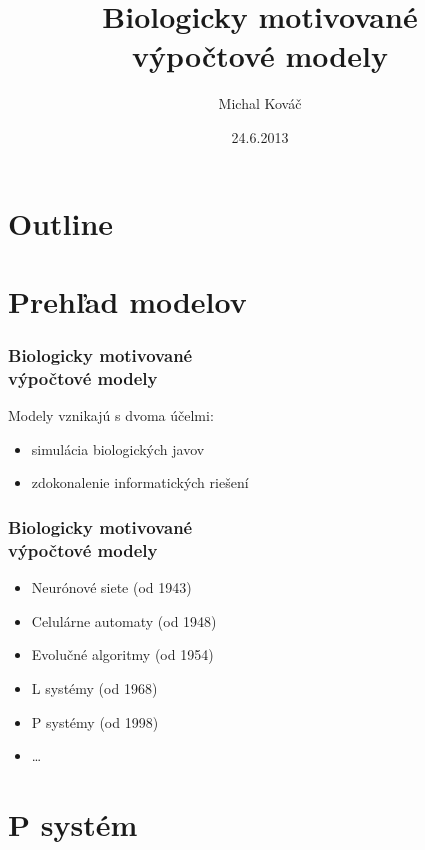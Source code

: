 \documentclass{beamer}
\title{Biologicky motivované \\výpočtové modely}
\author{Michal Kováč}
\institute{FMFI UK}
\date{24.6.2013}
\begin{document}
\begin{frame}[t]
\titlepage
\end{frame}

\section*{Outline}
\begin{frame}
\tableofcontents
\end{frame}

\section{Prehľad modelov} %
\label{sec:prehlad_modelov}

\begin{frame}[t]\frametitle{Biologicky motivované\\výpočtové modely}
Modely vznikajú s dvoma účelmi:
\begin{itemize}
  \item simulácia biologických javov
  \item zdokonalenie informatických riešení
\end{itemize}
\end{frame}

\begin{frame}[t]\frametitle{Biologicky motivované\\výpočtové modely}
\begin{itemize}
  \item Neurónové siete (od 1943)
  \item Celulárne automaty (od 1948)
  \item Evolučné algoritmy (od 1954)
  \item L systémy (od 1968)
  \item P systémy (od 1998) \cite{Paun98}
  \item \dots

\end{itemize}
\end{frame}


\section{P systém} %
\label{sec:membranov_systemy}
\end{document}
